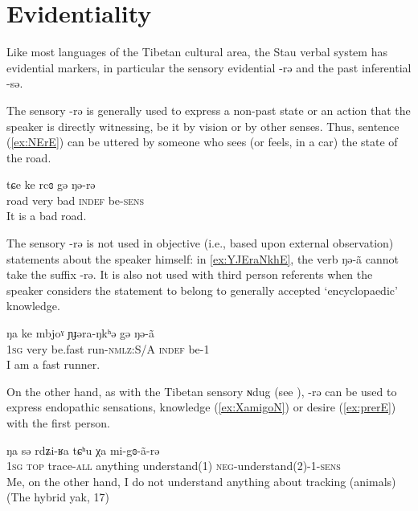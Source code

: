 \documentclass[oneside,a4paper,11pt]{article}
\newcommand{\ipa}[1]{{\phon#1}} %
\begin{document}
\section{Evidentiality}

Like most languages of the Tibetan cultural area, the Stau verbal system has evidential markers, in particular the sensory evidential \ipa{-rə} and the past inferential \ipa{-sə}.

The sensory  \ipa{-rə} is generally used to express a non-past state or an action that the speaker is directly witnessing, be it by vision or by other senses. Thus, sentence (\ref{ex:NErE}) can be uttered by someone who sees (or feels, in a car) the state of the road.

 \begin{exe}
\ex \label{ex:NErE}
\gll
\ipa{tɕe} 	\ipa{ke} 	\ipa{rcɞ} 	\ipa{gə} 	\ipa{ŋə-rə}  \\
road very bad \textsc{indef} be-\textsc{sens} \\
\glt It is a bad road.
 \end{exe}
 
The sensory \ipa{-rə} is not used in objective (i.e., based upon external observation) statements about the speaker himself: in \ref{ex:YJEraNkhE},  the verb \ipa{ŋə-ã} cannot take  the suffix \ipa{-rə}. It is also not used with third person referents when the speaker  considers the statement  to belong to generally accepted `encyclopaedic' knowledge. 

  \begin{exe}
\ex \label{ex:YJEraNkhE}
\gll
  \ipa{ŋa} 	\ipa{ke} \ipa{mbjoˠ} 	\ipa{ɲɟəra-ŋkʰə} 	\ipa{gə} 	\ipa{ŋə-ã} \\
\textsc{1sg} very be.fast run-\textsc{nmlz}:S/A \textsc{indef} be-1 \\
\glt I am a fast runner.
  \end{exe}
  
 
  
On the other hand, as with the Tibetan sensory \ipa{ɴdug} (see \citealt{tournadre14evidentiality}), \ipa{-rə}  can be used to express endopathic sensations, knowledge (\ref{ex:XamigoN}) or desire (\ref{ex:prerE}) with the first person.

\begin{exe}
\ex \label{ex:XamigoN}
\gll
\ipa{ŋa} 	\ipa{sə} 	\ipa{rdʑi-ʁa} 	\ipa{tɕʰu} 	\ipa{χa} 	\ipa{mi-gɞ-ã-rə} 	\\
\textsc{1sg} \textsc{top} trace-\textsc{all} anything understand(1) \textsc{neg}-understand(2)-1-\textsc{sens} \\
\glt Me, on the other hand, I do not understand anything about tracking (animals) (The hybrid yak, 17)
\end{exe}
\end{document}
